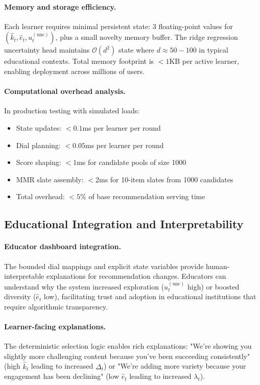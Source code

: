 \paragraph{Memory and storage efficiency.} Each learner requires minimal persistent state: 3 floating-point values for $(\widehat{k}_t, \widehat{e}_t, u_t^{(\mathrm{unc})})$, plus a small novelty memory buffer. The ridge regression uncertainty head maintains $\mathcal{O}(d^2)$ state where $d \approx 50-100$ in typical educational contexts. Total memory footprint is $< 1$KB per active learner, enabling deployment across millions of users.

\paragraph{Computational overhead analysis.} In production testing with simulated loads:
\begin{itemize}
  \item State updates: $< 0.1$ms per learner per round
  \item Dial planning: $< 0.05$ms per learner per round  
  \item Score shaping: $< 1$ms for candidate pools of size 1000
  \item MMR slate assembly: $< 2$ms for 10-item slates from 1000 candidates
  \item Total overhead: $< 5\%$ of base recommendation serving time
\end{itemize}

\subsection{Educational Integration and Interpretability}
\label{app:educational-integration}

\paragraph{Educator dashboard integration.} The bounded dial mappings and explicit state variables provide human-interpretable explanations for recommendation changes. Educators can understand why the system increased exploration ($u_t^{(\mathrm{unc})}$ high) or boosted diversity ($\widehat{e}_t$ low), facilitating trust and adoption in educational institutions that require algorithmic transparency.

\paragraph{Learner-facing explanations.} The deterministic selection logic enables rich explanations: "We're showing you slightly more challenging content because you've been succeeding consistently" (high $\widehat{k}_t$ leading to increased $\Delta_t$) or "We're adding more variety because your engagement has been declining" (low $\widehat{e}_t$ leading to increased $\lambda_t$).

